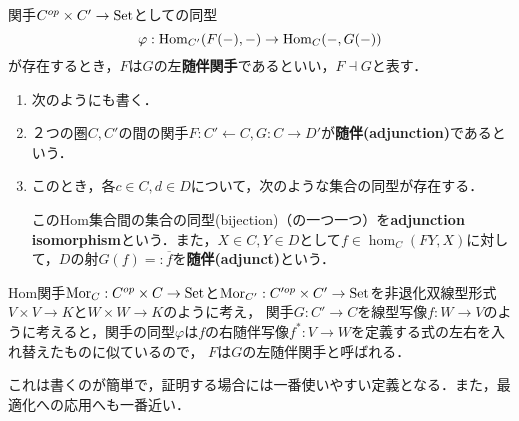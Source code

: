 \documentclass[uplatex, dvipdfmx]{jsreport}
\begin{document}
\begin{definition}[adjoint]
    関手$C^{op}\times C'\to\mathrm{Set}$としての同型
    \[\varphi:\mathrm{Hom}_{C'}(F(-),-)\to\mathrm{Hom}_C(-,G(-))\]
    が存在するとき，$F$は$G$の左\textbf{随伴関手}であるといい，$F\dashv G$と表す．
\end{definition}
\begin{remark}\mbox{}
    \begin{enumerate}
        \item 次のようにも書く．
        \begin{center}\end{center}
        \item ２つの圏$C,C'$の間の関手$F:C'\leftarrow C, G:C\rightarrow D'$が\textbf{随伴(adjunction)}であるという．
        \item このとき，各$c\in C, d\in D$について，次のような集合の同型が存在する．
        \begin{center}\end{center}
        このHom集合間の集合の同型(bijection)（の一つ一つ）を\textbf{adjunction isomorphism}という．また，$X\in C, Y\in D$として$f\in\hom_C(FY,X)$に対して，$D$の射$G(f)=:\overline{f}$を\textbf{随伴(adjunct)}という．
    \end{enumerate}
\end{remark}

\begin{remark}
    Hom関手$\mathrm{Mor}_C:C^{op}\times C\to\mathrm{Set}$と$\mathrm{Mor}_{C'}:C'^{op}\times C'\to\mathrm{Set}$を非退化双線型形式$V\times V\to K$と$W\times W\to K$のように考え，
    関手$G:C'\to C$を線型写像$f:W\to V$のように考えると，関手の同型$\varphi$は$f$の右随伴写像$f^*:V\to W$を定義する式の左右を入れ替えたものに似ているので，
    $F$は$G$の左随伴関手と呼ばれる．
\end{remark}

\begin{definition}[普遍射を用いた定義]
    
\end{definition}
これは書くのが簡単で，証明する場合には一番使いやすい定義となる．また，最適化への応用へも一番近い．
\end{document}
